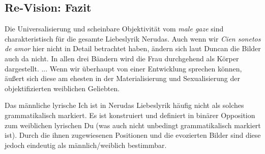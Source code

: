 \subsection{Re-Vision: Fazit}

Die Universalisierung und scheinbare Objektivität vom \textit{male gaze} sind charakteristisch für die gesamte Liebeslyrik Nerudas.
Auch wenn wir \textit{Cien sonetos de amor} hier nicht in Detail betrachtet haben, ändern sich laut Duncan die Bilder auch da nicht.
In allen drei Bändern wird die Frau durchgehend als Körper dargestellt.
...
Wenn wir überhaupt von einer Entwicklung sprechen können, äußert sich diese am ehesten in der Materialisierung und Sexualisierung der objektifizierten weiblichen Geliebten.

Das männliche lyrische Ich ist in Nerudas Liebeslyrik häufig nicht als solches grammatikalisch markiert.
Es ist konstruiert und definiert in binärer Opposition zum weiblichen lyrischen Du (was auch nicht unbedingt grammatikalisch markiert ist).
Durch die ihnen zugewiesenen Positionen und die evozierten Bilder sind diese jedoch eindeutig als männlich/weiblich bestimmbar.

\begin{comment}
[Duncan1992]
In Neruda's poems, the male speaker is seen as the voice of authority; his view is rarely, if ever, questioned, since it is presented as the only view possible.
Because he duplicates dominate cultural values in his text, his voice has the ringof truth to it.
But as E. Ann Kaplan has noted, this ``dominating male gaze, carrying with it social, political, and economic as well as sexual power, relegates women to absence, silence, and marginality...'' (5). 
In this light, Neruda's text can be seen as both container and disseminater of ideoloy, for it pormotes the long-standing notion of male superiority and female passivity as natural facts when, in reality, they are merely culturally determined conditions."
\end{comment}

